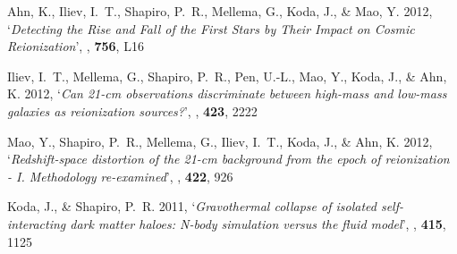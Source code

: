 \begin{thebibliography}{8}
{Ahn}, K., {Iliev}, I.~T., {Shapiro}, P.~R., {Mellema}, G., {Koda}, J., \&
  {Mao}, Y. 2012, `{\it Detecting the Rise and Fall of the First Stars by Their
  Impact on Cosmic Reionization}', {\em \apjl\/}, {\bf 756}, L16

{Iliev}, I.~T., {Mellema}, G., {Shapiro}, P.~R., {Pen}, U.-L., {Mao}, Y.,
  {Koda}, J., \& {Ahn}, K. 2012, `{\it Can 21-cm observations discriminate between
  high-mass and low-mass galaxies as reionization sources?}', {\em \mnras\/},
  {\bf 423}, 2222

{Mao}, Y., {Shapiro}, P.~R., {Mellema}, G., {Iliev}, I.~T., {Koda}, J., \&
  {Ahn}, K. 2012, `{\it Redshift-space distortion of the 21-cm background from the
  epoch of reionization - I. Methodology re-examined}', {\em \mnras\/}, {\bf
  422}, 926





{Koda}, J., \& {Shapiro}, P.~R. 2011, `{\it Gravothermal collapse of isolated
  self-interacting dark matter haloes: N-body simulation versus the fluid
  model}', {\em \mnras\/}, {\bf 415}, 1125


\end{thebibliography}
